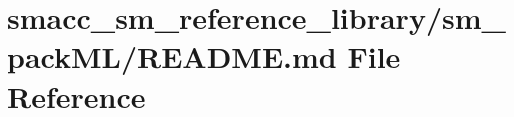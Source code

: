 \hypertarget{smacc__sm__reference__library_2sm__packML_2README_8md}{}\section{smacc\+\_\+sm\+\_\+reference\+\_\+library/sm\+\_\+pack\+M\+L/\+R\+E\+A\+D\+ME.md File Reference}
\label{smacc__sm__reference__library_2sm__packML_2README_8md}

